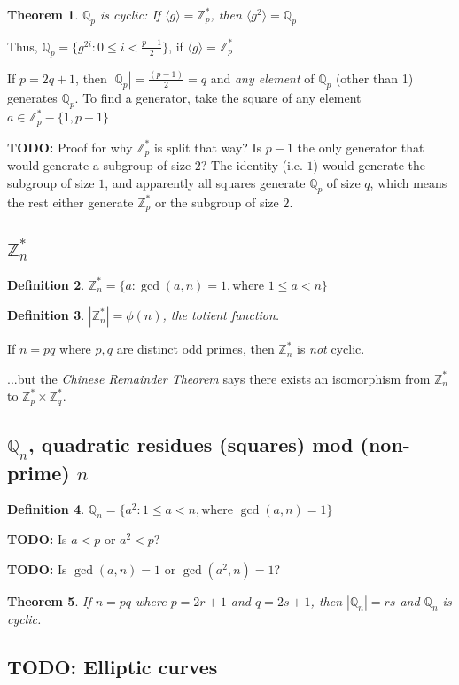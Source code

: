 \documentclass[12pt]{article}
\newtheorem{thm}{Theorem}[section]
\newtheorem{definition}[thm]{Definition}
\newcommand{\Zp}{\mathbb{Z}^{\ast}_p}
\newcommand{\Zq}{\mathbb{Z}^{\ast}_q}
\newcommand{\Zn}{\mathbb{Z}^{\ast}_n}
\newcommand{\Qp}{\mathbb{Q}_p}
\newcommand{\Qn}{\mathbb{Q}_n}
\newcommand{\gen}[1]{\langle #1 \rangle}
\newcommand{\todo}{\textbf{TODO:} }
\newcommand{\sz}[1]{\left|#1\right|}
\begin{document}
\begin{thm}
$\Qp$ is cyclic: If $\gen{g} = \Zp$, then $\gen{g^2} = \Qp$
\end{thm}

Thus, $\Qp = \{g^{2i} : 0 \le i < \frac{p-1}{2}\}$, if $\gen{g} = \Zp$

If $p = 2q + 1$, then $\sz{\Qp} = \frac{(p-1)}{2} = q$ and \emph{any element} of
$\Qp$ (other than 1) generates $\Qp$. To find a generator, take the square of
any element $a \in \Zp - \{1, p-1\}$

\todo Proof for why $\Zp$ is split that way? Is $p-1$ the only generator
that would generate a subgroup of size $2$? The identity (i.e. $1$) would generate
the subgroup of size $1$, and apparently all squares generate $\Qp$ of size $q$,
which means the rest either generate $\Zp$ or the subgroup of size $2$.

\subsection{$\Zn$}

\begin{definition}
$\Zn = \{a : \gcd(a, n) = 1, \text{where } 1 \le a < n\}$
\end{definition}

\begin{definition}
$\sz{\Zn} = \phi(n)$, the \emph{totient} function.
\end{definition}

If $n = pq$ where $p,q$ are distinct odd primes, then $\Zn$ is \emph{not} cyclic.

...but the \emph{Chinese Remainder Theorem} says there exists an isomorphism
from $\Zn$ to $\Zp \times \Zq$.

\subsection{$\Qn$, quadratic residues (squares) mod (non-prime) $n$}
\begin{definition}
$\Qn = \{a^2 : 1 \le a < n, \text{where } \gcd(a, n) = 1\}$
\end{definition}

\todo Is $a < p$ or $a^2 < p$?

\todo Is $\gcd(a, n) = 1$ or $\gcd(a^2, n) = 1$?

\begin{thm}
If $n = pq$ where $p = 2r+1$ and $q = 2s+1$, then $\sz{\Qn} = rs$ and
$\Qn$ is cyclic.
\end{thm}

\subsection{TODO: Elliptic curves}

\nocite{*}
\printbibliography
\end{document}
